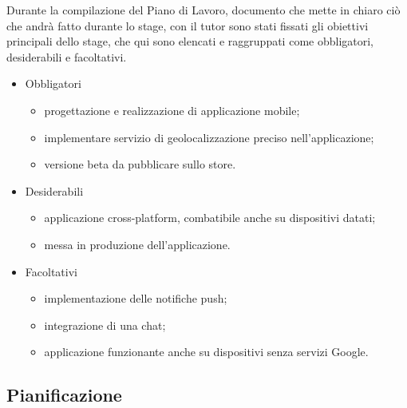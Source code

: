 Durante la compilazione del Piano di Lavoro, documento che mette in chiaro ciò che andrà fatto durante lo stage, con il tutor sono stati fissati gli obiettivi principali dello stage, che qui sono elencati e raggruppati come obbligatori, desiderabili e facoltativi.

\begin{itemize}
	\item Obbligatori
	\begin{itemize}
		\item progettazione e realizzazione di applicazione mobile;
    \item implementare servizio di geolocalizzazione preciso nell’applicazione;
    \item versione beta da pubblicare sullo store.
	\end{itemize}

	\item Desiderabili
	\begin{itemize}
		\item applicazione cross-platform, combatibile anche su dispositivi datati;
    \item messa in produzione dell’applicazione.
	\end{itemize}

	\item Facoltativi
	\begin{itemize}
		\item implementazione delle notifiche push;
    \item integrazione di una chat;
    \item applicazione funzionante anche su dispositivi senza servizi Google.
	\end{itemize}
\end{itemize}

\subsection{Pianificazione}

